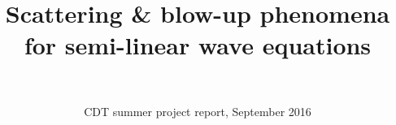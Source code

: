 \documentclass{beamer}
\title[Short version of title]{Scattering \& blow-up phenomena for semi-linear wave equations} %
\author%
{%
    \sc{Author: Edmund A. Paxton}\\
   \newline \sc{Supervisor: Prof. Luc Nguyen} \newline
}
\institute%
{%
    \textit{Mathematical Institute}\\
    \textit{University of Oxford}
}
\date[PoM2015]{CDT summer project report, September 2016} %
\begin{document}
\begin{frame}[plain]
  \titlepage 
\end{frame}
\end{document}
